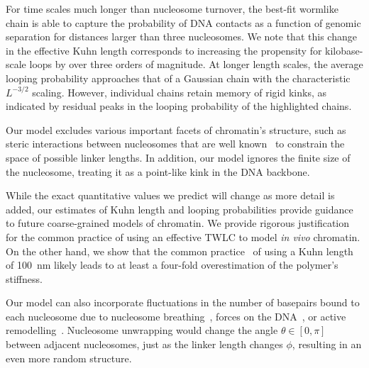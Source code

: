 \documentclass[%
 reprint,
superscriptaddress,
showpacs,preprintnumbers,
 amsmath,amssymb,
 aps,
 prl,
]{revtex4-1}
\begin{document}
For time scales much longer than nucleosome turnover, the best-fit wormlike
    chain is able to capture the probability of DNA contacts as a function of
    genomic separation for distances larger than three nucleosomes.
We note that this change in the effective Kuhn length corresponds to increasing
    the propensity for kilobase-scale loops by over three orders of magnitude.
At longer length scales, the average looping probability approaches that of a
    Gaussian chain with the characteristic $L^{-3/2}$ scaling.
However, individual chains retain memory of rigid kinks, as indicated by
    residual peaks in the looping probability of the highlighted chains.



Our model excludes various important facets of chromatin's structure, such as
    steric interactions between nucleosomes that are well known~\cite{widom1992}
    to constrain the space of possible linker lengths.
In addition, our model ignores the finite size of the nucleosome, treating it as
    a point-like kink in the DNA backbone.

While the exact quantitative values we predict will change as more detail is
    added, our estimates of Kuhn length and looping probabilities provide
    guidance to future coarse-grained models of chromatin.
We provide rigorous justification for the common practice of using an effective
    TWLC to model \textit{in vivo} chromatin.
On the other hand, we show that the common practice~\cite{macphersonInPress,nuebler2018}
    of using a Kuhn length of \SI{100}{\nano\metre} likely leads to at least a
    four-fold overestimation of the polymer's stiffness.

Our model can also incorporate fluctuations in the number of basepairs bound to
    each nucleosome due to nucleosome
    breathing~\cite{TODO}, forces on the DNA~\cite{TODO}, or active
    remodelling~\cite{dion2007,kulaeva2007,senavirathne2017}.
Nucleosome unwrapping would change the angle $\theta \in [0, \pi]$
    between adjacent nucleosomes, just as the linker length changes
    $\phi$, resulting in an even more random structure.
\end{document}
